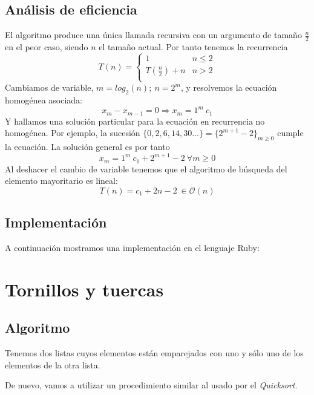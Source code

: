 \documentclass[a4paper, 11pt]{article} %
\begin{document}
\subsection{Análisis de eficiencia}
El algoritmo produce una única llamada recursiva con un argumento de tamaño $\frac{n}{2}$ en el peor caso, siendo $n$ el tamaño actual. Por tanto tenemos la recurrencia
\begin{equation}
\label{eqmay}
T(n)=\left\lbrace
	    \begin{array}{lr}
            1 & n\le 2\\
            T\left(\frac{n}{2}\right) + n & n>2\\
            \end{array}
	    \right.
\end{equation} 
Cambiamos de variable, $m = log_2(n);\ n = 2^m$, y resolvemos la ecuación homogénea asociada:
$$ x_m-x_{m-1}=0 \Rightarrow x_m = 1^m\ c_1 $$
Y hallamos una solución particular para la ecuación en recurrencia no homogénea. Por ejemplo, la sucesión $\{0, 2, 6, 14, 30\dots\}=\{2^{m+1}-2\}_{m\ge 0}$ cumple la ecuación. La solución general es por tanto
$$ x_m = 1^m\ c_1 + 2^{m+1}-2\ \forall m\ge 0$$
Al deshacer el cambio de variable tenemos que el algoritmo de búsqueda del elemento mayoritario es lineal:
$$ T(n) = c_1 + 2n-2\ \in \mathcal{O}(n)$$

\subsection{Implementación}
A continuación mostramos una implementación en el lenguaje Ruby:

\small
\texttt{}
\normalsize

\section {Tornillos y tuercas}
  \subsection{Algoritmo}

    Tenemos dos listas cuyos elementos están emparejados con uno y sólo uno de los elementos de la otra lista.
    
    De nuevo, vamos a utilizar un procedimiento similar al usado por el \textit{Quicksort}.
    
\end{document}
